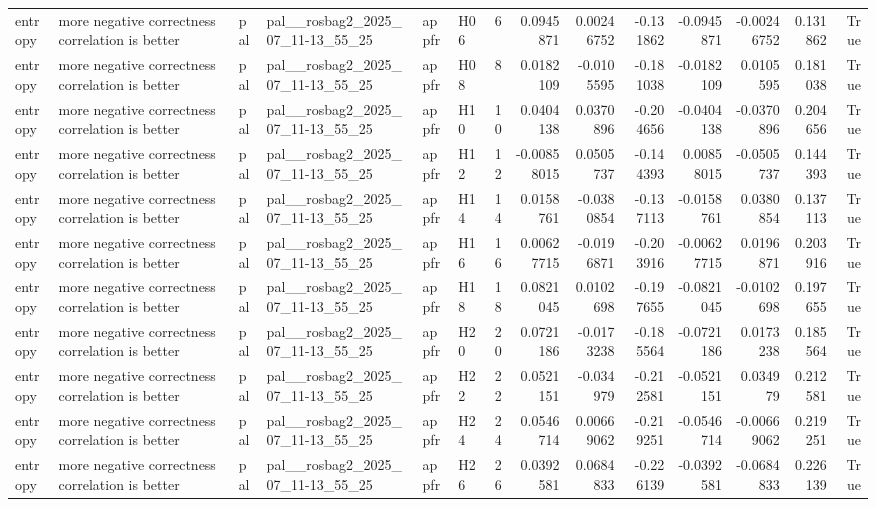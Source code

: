 \begin{longtable}{llllllrrrrrrrr}
entropy & more negative correctness correlation is better & pal & pal\_\_rosbag2\_2025\_07\_11-13\_55\_25 & appfr & H06 & 6 & 0.0945871 & 0.00246752 & -0.131862 & -0.0945871 & -0.00246752 & 0.131862 & True \\
entropy & more negative correctness correlation is better & pal & pal\_\_rosbag2\_2025\_07\_11-13\_55\_25 & appfr & H08 & 8 & 0.0182109 & -0.0105595 & -0.181038 & -0.0182109 & 0.0105595 & 0.181038 & True \\
entropy & more negative correctness correlation is better & pal & pal\_\_rosbag2\_2025\_07\_11-13\_55\_25 & appfr & H10 & 10 & 0.0404138 & 0.0370896 & -0.204656 & -0.0404138 & -0.0370896 & 0.204656 & True \\
entropy & more negative correctness correlation is better & pal & pal\_\_rosbag2\_2025\_07\_11-13\_55\_25 & appfr & H12 & 12 & -0.00858015 & 0.0505737 & -0.144393 & 0.00858015 & -0.0505737 & 0.144393 & True \\
entropy & more negative correctness correlation is better & pal & pal\_\_rosbag2\_2025\_07\_11-13\_55\_25 & appfr & H14 & 14 & 0.0158761 & -0.0380854 & -0.137113 & -0.0158761 & 0.0380854 & 0.137113 & True \\
entropy & more negative correctness correlation is better & pal & pal\_\_rosbag2\_2025\_07\_11-13\_55\_25 & appfr & H16 & 16 & 0.00627715 & -0.0196871 & -0.203916 & -0.00627715 & 0.0196871 & 0.203916 & True \\
entropy & more negative correctness correlation is better & pal & pal\_\_rosbag2\_2025\_07\_11-13\_55\_25 & appfr & H18 & 18 & 0.0821045 & 0.0102698 & -0.197655 & -0.0821045 & -0.0102698 & 0.197655 & True \\
entropy & more negative correctness correlation is better & pal & pal\_\_rosbag2\_2025\_07\_11-13\_55\_25 & appfr & H20 & 20 & 0.0721186 & -0.0173238 & -0.185564 & -0.0721186 & 0.0173238 & 0.185564 & True \\
entropy & more negative correctness correlation is better & pal & pal\_\_rosbag2\_2025\_07\_11-13\_55\_25 & appfr & H22 & 22 & 0.0521151 & -0.034979 & -0.212581 & -0.0521151 & 0.034979 & 0.212581 & True \\
entropy & more negative correctness correlation is better & pal & pal\_\_rosbag2\_2025\_07\_11-13\_55\_25 & appfr & H24 & 24 & 0.0546714 & 0.00669062 & -0.219251 & -0.0546714 & -0.00669062 & 0.219251 & True \\
entropy & more negative correctness correlation is better & pal & pal\_\_rosbag2\_2025\_07\_11-13\_55\_25 & appfr & H26 & 26 & 0.0392581 & 0.0684833 & -0.226139 & -0.0392581 & -0.0684833 & 0.226139 & True \\

\end{longtable}

